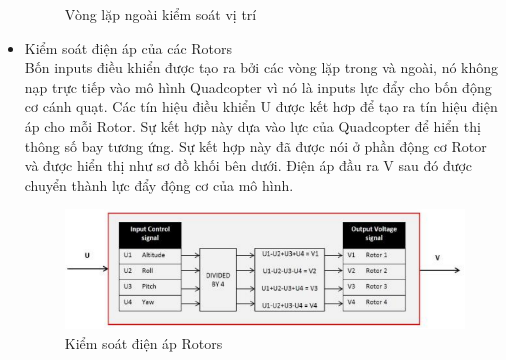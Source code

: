 \begin{itemize}
\begin{figure}[h!]
\begin{center}
	        		\caption{Vòng lặp ngoài kiểm soát vị trí}
	        	\end{center}
        \end{figure}
			\item Kiểm soát điện áp của các Rotors
			\\
			Bốn inputs điều khiển được tạo ra bởi các vòng lặp trong và ngoài, nó không nạp trực tiếp vào mô hình Quadcopter vì nó là inputs lực đẩy cho bốn động cơ cánh quạt. Các tín hiệu điều khiển U được kết hơp để tạo ra tín hiệu điện áp cho mỗi Rotor. Sự kết hợp này dựa vào lực của Quadcopter để hiển thị thông số bay tương ứng. Sự kết hợp này đã được nói ở phần động cơ Rotor và được hiển thị như sơ đồ khối bên dưới. Điện áp đầu ra V sau đó được chuyển thành lực đẩy động cơ của mô hình.
  \\
  \begin{figure}[h!]
	        	\begin{center}
	        		\includegraphics[scale=0.8]{images/Cuong-VolControl.png}
	        		\caption{Kiểm soát điện áp Rotors}
	        	\end{center}
        \end{figure}
			\end{itemize}